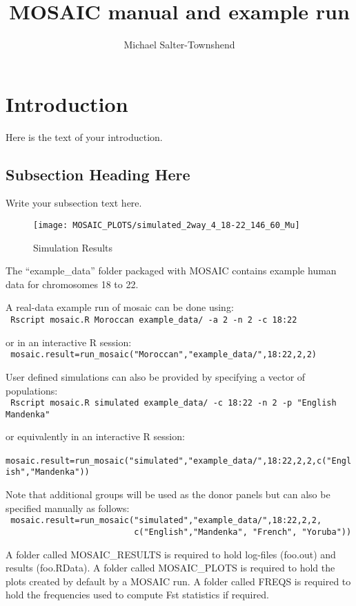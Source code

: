 \documentclass{article}
\begin{document}
\title{MOSAIC manual and example run}
\author{Michael Salter-Townshend}

\maketitle

\section{Introduction}
Here is the text of your introduction.

\subsection{Subsection Heading Here}
Write your subsection text here.

\begin{figure}
    \centering
    \texttt{[image: MOSAIC\_PLOTS/simulated\_2way\_4\_18-22\_146\_60\_Mu]}
    \caption{Simulation Results}
    \label{simMu}
\end{figure}


The ``example\_data'' folder packaged with MOSAIC contains example human data for chromosomes 18 to 22.

A real-data example run of mosaic can be done using:\\
\verb+ Rscript mosaic.R Moroccan example_data/ -a 2 -n 2 -c 18:22+

or in an interactive R session:\\
\verb+ mosaic.result=run_mosaic("Moroccan","example_data/",18:22,2,2)+

User defined simulations can also be provided by specifying a vector of populations:\\
\verb+ Rscript mosaic.R simulated example_data/ -c 18:22 -n 2 -p "English Mandenka"+

or equivalently in an interactive R session:\\
\verb+ mosaic.result=run_mosaic("simulated","example_data/",18:22,2,2,c("English","Mandenka")) +

Note that additional groups will be used as the donor panels but can also be specified manually as follows:\\
\verb+ mosaic.result=run_mosaic("simulated","example_data/",18:22,2,2,+\\
\verb+                          c("English","Mandenka", "French", "Yoruba"))+

A folder called MOSAIC\_RESULTS is required to hold log-files (foo.out) and results (foo.RData).  
A folder called MOSAIC\_PLOTS is required to hold the plots created by default by a MOSAIC run.
A folder called FREQS is required to hold the frequencies used to compute Fst statistics if required.
\end{document}
